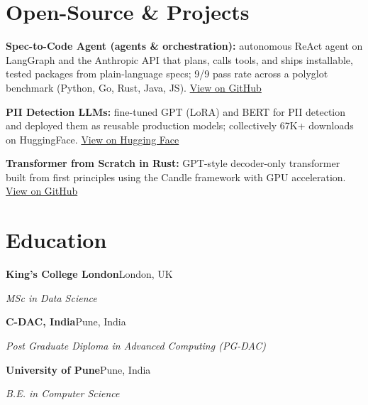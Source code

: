 \documentclass[10pt,a4paper]{article}
\begin{document}
\section{Open-Source \& Projects}
\begin{tight}
  \item \textbf{Spec-to-Code Agent (agents \& orchestration):} autonomous ReAct agent on LangGraph and the Anthropic API that plans, calls tools, and ships installable, tested packages from plain-language specs; 9/9 pass rate across a polyglot benchmark (Python, Go, Rust, Java, JS). \href{https://github.com/abhijeetscode/Spec-to-Code-Agent}{View on GitHub}
  \item \textbf{PII Detection LLMs:} fine-tuned GPT (LoRA) and BERT for PII detection and deployed them as reusable production models; collectively 67K+ downloads on HuggingFace. \href{https://huggingface.co/ab-ai/pii_model}{View on Hugging Face}
  \item \textbf{Transformer from Scratch in Rust:} GPT-style decoder-only transformer built from first principles using the Candle framework with GPU acceleration. \href{https://github.com/abhijeetscode/transformer-rust}{View on GitHub}
\end{tight}

\section{Education}
{\color{company}\bfseries King's College London}\hfill {\color{muted}London, UK}\par
{\itshape MSc in Data Science}\par\vspace{2pt}
{\color{company}\bfseries C-DAC, India}\hfill {\color{muted}Pune, India}\par
{\itshape Post Graduate Diploma in Advanced Computing (PG-DAC)}\par\vspace{2pt}
{\color{company}\bfseries University of Pune}\hfill {\color{muted}Pune, India}\par
{\itshape B.E. in Computer Science}\par
\end{document}
